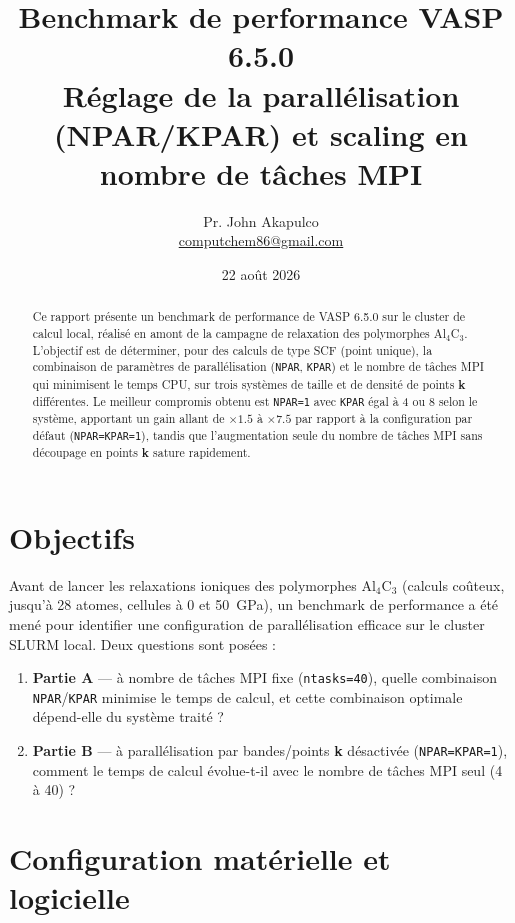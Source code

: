 \documentclass[11pt,a4paper]{article}
\title{\vspace{-1.5cm}Benchmark de performance VASP 6.5.0\\[2pt]
\large Réglage de la parallélisation (NPAR/KPAR) et scaling en nombre de tâches MPI}
\author{Pr. John Akapulco \\ \small \href{mailto:computchem86@gmail.com}{computchem86@gmail.com}}
\date{22 août 2026}
\begin{document}
\maketitle
\vspace{-0.5cm}

\begin{abstract}
\noindent
Ce rapport présente un benchmark de performance de VASP 6.5.0 sur le cluster de calcul local,
réalisé en amont de la campagne de relaxation des polymorphes Al$_4$C$_3$. L'objectif est de
déterminer, pour des calculs de type SCF (point unique), la combinaison de paramètres de
parallélisation (\texttt{NPAR}, \texttt{KPAR}) et le nombre de tâches MPI qui minimisent le temps
CPU, sur trois systèmes de taille et de densité de points \textbf{k} différentes. Le meilleur
compromis obtenu est \texttt{NPAR=1} avec \texttt{KPAR} égal à 4 ou 8 selon le système, apportant
un gain allant de $\times1.5$ à $\times7.5$ par rapport à la configuration par défaut
(\texttt{NPAR=KPAR=1}), tandis que l'augmentation seule du nombre de tâches MPI sans découpage en
points \textbf{k} sature rapidement.
\end{abstract}

\section{Objectifs}

Avant de lancer les relaxations ioniques des polymorphes Al$_4$C$_3$ (calculs coûteux, jusqu'à
28 atomes, cellules à 0 et 50~GPa), un benchmark de performance a été mené pour identifier une
configuration de parallélisation efficace sur le cluster SLURM local. Deux questions sont posées :

\begin{enumerate}[label=(\alph*)]
  \item \textbf{Partie A} — à nombre de tâches MPI fixe (\texttt{ntasks=40}), quelle combinaison
  \texttt{NPAR}/\texttt{KPAR} minimise le temps de calcul, et cette combinaison optimale
  dépend-elle du système traité ?
  \item \textbf{Partie B} — à parallélisation par bandes/points \textbf{k} désactivée
  (\texttt{NPAR=KPAR=1}), comment le temps de calcul évolue-t-il avec le nombre de tâches MPI
  seul (4 à 40) ?
\end{enumerate}

\section{Configuration matérielle et logicielle}
\end{document}
